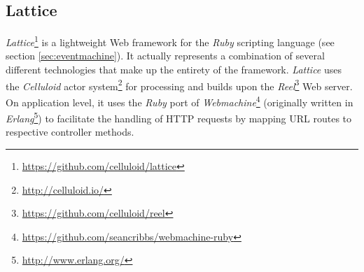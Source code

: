 \subsection{Lattice}
\textit{Lattice}\footnote{\url{https://github.com/celluloid/lattice}} is a lightweight Web framework for the \textit{Ruby} scripting language (see section \ref{sec:eventmachine}). It actually represents a combination of several different technologies that make up the entirety of the framework. \textit{Lattice} uses the \textit{Celluloid} actor system\footnote{\url{http://celluloid.io/}} for processing and builds upon the \textit{Reel}\footnote{\url{https://github.com/celluloid/reel}} Web server. On application level, it uses the \textit{Ruby} port of \textit{Webmachine}\footnote{\url{https://github.com/seancribbs/webmachine-ruby}} (originally written in \textit{Erlang}\footnote{\url{http://www.erlang.org/}}) to facilitate the handling of HTTP requests by mapping URL routes to respective controller methods. 

